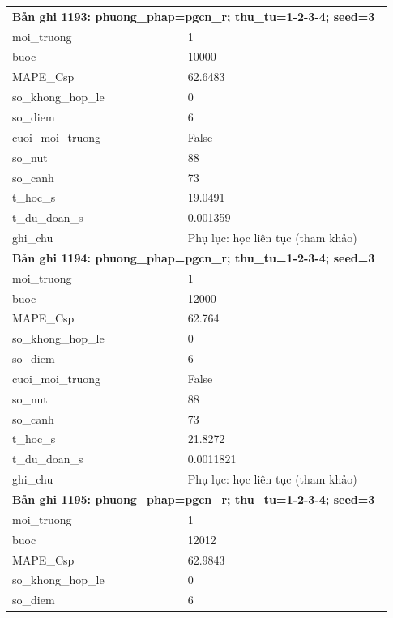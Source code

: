 \begin{longtable}{p{0.43\linewidth}p{0.50\linewidth}}
\midrule
\multicolumn{2}{p{0.95\linewidth}}{\textbf{Bản ghi 1193: phuong\_phap=pgcn\_r; thu\_tu=1-2-3-4; seed=3}} \\
moi\_\allowbreak truong & 1 \\
buoc & 10000 \\
MAPE\_\allowbreak Csp & 62.6483 \\
so\_\allowbreak khong\_\allowbreak hop\_\allowbreak le & 0 \\
so\_\allowbreak diem & 6 \\
cuoi\_\allowbreak moi\_\allowbreak truong & False \\
so\_\allowbreak nut & 88 \\
so\_\allowbreak canh & 73 \\
t\_\allowbreak hoc\_\allowbreak s & 19.0491 \\
t\_\allowbreak du\_\allowbreak doan\_\allowbreak s & 0.001359 \\
ghi\_\allowbreak chu & Phụ lục: học liên tục (tham khảo) \\
\midrule
\multicolumn{2}{p{0.95\linewidth}}{\textbf{Bản ghi 1194: phuong\_phap=pgcn\_r; thu\_tu=1-2-3-4; seed=3}} \\
moi\_\allowbreak truong & 1 \\
buoc & 12000 \\
MAPE\_\allowbreak Csp & 62.764 \\
so\_\allowbreak khong\_\allowbreak hop\_\allowbreak le & 0 \\
so\_\allowbreak diem & 6 \\
cuoi\_\allowbreak moi\_\allowbreak truong & False \\
so\_\allowbreak nut & 88 \\
so\_\allowbreak canh & 73 \\
t\_\allowbreak hoc\_\allowbreak s & 21.8272 \\
t\_\allowbreak du\_\allowbreak doan\_\allowbreak s & 0.0011821 \\
ghi\_\allowbreak chu & Phụ lục: học liên tục (tham khảo) \\
\midrule
\multicolumn{2}{p{0.95\linewidth}}{\textbf{Bản ghi 1195: phuong\_phap=pgcn\_r; thu\_tu=1-2-3-4; seed=3}} \\
moi\_\allowbreak truong & 1 \\
buoc & 12012 \\
MAPE\_\allowbreak Csp & 62.9843 \\
so\_\allowbreak khong\_\allowbreak hop\_\allowbreak le & 0 \\
so\_\allowbreak diem & 6 \\

\end{longtable}
